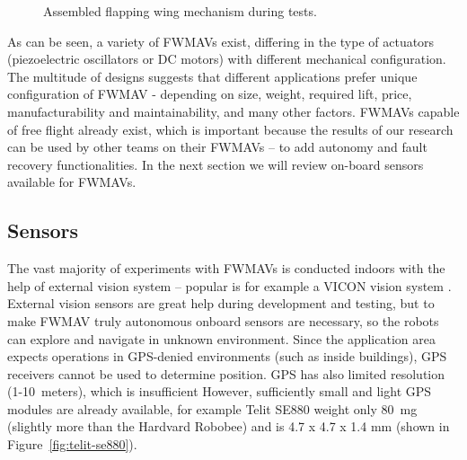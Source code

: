 \begin{figure}
\caption[Assembled FWMAV with planetary gear transmission]{Assembled flapping wing mechanism during tests. \cite{cpsgroup} \newline \newline \newline \newline}
\label{fig:our_wing_assembly_whole}
\endminipage\hfill
\end{figure}


As can be seen, a variety of FWMAVs exist, differing in the type of actuators (piezoelectric oscillators or DC motors) with different mechanical configuration. The multitude of designs suggests that different applications prefer unique configuration of FWMAV - depending on size, weight, required lift, price, manufacturability and maintainability, and many other factors. FWMAVs capable of free flight already exist, which is important because the results of our research can be used by other teams on their FWMAVs -- to add autonomy and fault recovery functionalities. In the next section we will review  on-board sensors available for FWMAVs.


\subsection{Sensors}
\label{sec:sensors}
The vast majority of experiments with FWMAVs is conducted indoors with the help of external vision system -- popular is for example a VICON vision system \cite{Wood2008} \cite{Rosen2016} \cite{Hines2015}. External vision sensors are great help during development and testing, but to make FWMAV truly autonomous onboard sensors are necessary, so the robots can explore and navigate in unknown environment. Since the application area expects operations in GPS-denied environments (such as inside buildings), GPS receivers cannot be used to determine position. GPS has also limited resolution (1-10~meters), which is insufficient However, sufficiently small and light GPS modules are already available, for example Telit SE880\cite{telit} weight only 80~mg (slightly more than the Hardvard Robobee) and is 4.7 x 4.7 x 1.4 mm (shown in Figure~\ref{fig:telit-se880}).

